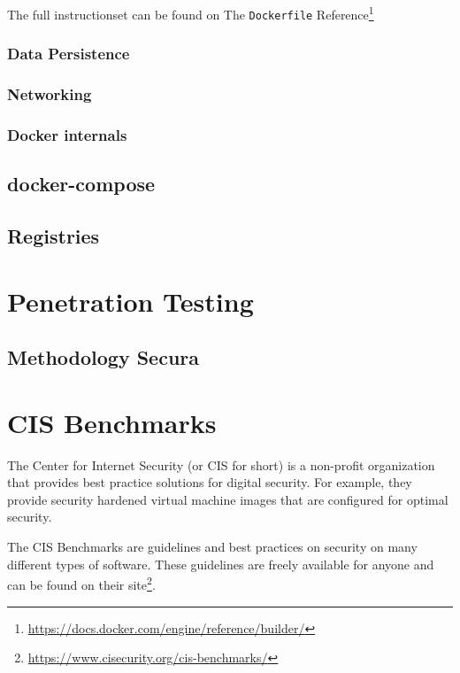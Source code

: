 The full instructionset can be found on The \lstinline{Dockerfile} Reference\footnote{\url{https://docs.docker.com/engine/reference/builder/}}

\subsubsection{Data Persistence}

\subsubsection{Networking}

\subsubsection{Docker internals}


\subsection{docker-compose}

\subsection{Registries}

\section{Penetration Testing}
\subsection{Methodology Secura}

\section{CIS Benchmarks}
The Center for Internet Security (or CIS for short) is a non-profit organization that provides best practice solutions for digital security. For example, they provide security hardened virtual machine images that are configured for optimal security.

\hfill

The CIS Benchmarks are guidelines and best practices on security on many different types of software. These guidelines are freely available for anyone and can be found on their site\footnote{\url{https://www.cisecurity.org/cis-benchmarks/}}.

